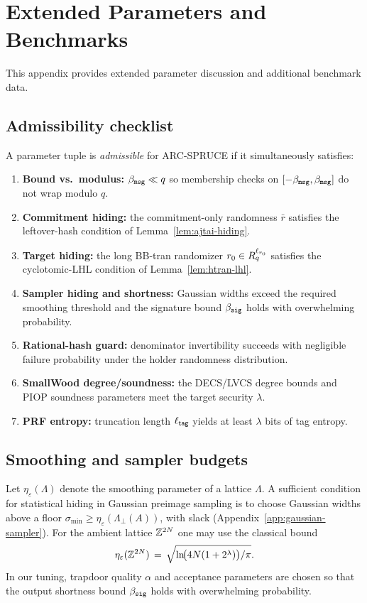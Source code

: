\section{Extended Parameters and Benchmarks}
\label{app:ext-params}

This appendix provides extended parameter discussion and additional benchmark data.

\subsection{Admissibility checklist}
A parameter tuple is \emph{admissible} for ARC-SPRUCE if it simultaneously satisfies:
\begin{enumerate}[leftmargin=1.25em]
  \item \textbf{Bound vs.\ modulus:} \(\beta_{\mathtt{msg}} \ll q\) so membership checks on \([ -\beta_{\mathtt{msg}},\beta_{\mathtt{msg}}]\) do not wrap modulo \(q\).
  \item \textbf{Commitment hiding:} the commitment-only randomness \(\bar r\) satisfies the leftover-hash condition of Lemma~\ref{lem:ajtai-hiding}.
  \item \textbf{Target hiding:} the long BB-tran randomizer \(r_0\in R_q^{\ell_{r_0}}\) satisfies the cyclotomic-LHL condition of Lemma~\ref{lem:htran-lhl}.
  \item \textbf{Sampler hiding and shortness:} Gaussian widths exceed the required smoothing threshold and the signature
  bound \(\beta_{\mathtt{sig}}\) holds with overwhelming probability.
  \item \textbf{Rational-hash guard:} denominator invertibility succeeds with negligible failure probability under the
  holder randomness distribution.
  \item \textbf{SmallWood degree/soundness:} the DECS/LVCS degree bounds and PIOP soundness parameters meet the target
  security \(\lambda\).
  \item \textbf{PRF entropy:} truncation length \(\ell_{\mathsf{tag}}\) yields at least \(\lambda\) bits of tag entropy.
\end{enumerate}

\subsection{Smoothing and sampler budgets}
Let \(\eta_\varepsilon(\Lambda)\) denote the smoothing parameter of a lattice \(\Lambda\). A sufficient condition for
statistical hiding in Gaussian preimage sampling is to choose Gaussian widths above a floor
\(\sigma_{\min}\ge \eta_\varepsilon(\Lambda_\perp(A))\), with slack (Appendix~\ref{app:gaussian-sampler}).
For the ambient lattice \(\mathbb{Z}^{2N}\) one may use the classical bound
\[
  \eta_\varepsilon(\mathbb{Z}^{2N})
  \,=\,
  \sqrt{\ln\!\bigl(4N(1+2^\lambda)\bigr)/\pi}.
\]
In our tuning, trapdoor quality \(\alpha\) and acceptance parameters are chosen so that the output shortness bound
\(\beta_{\mathtt{sig}}\) holds with overwhelming probability.

